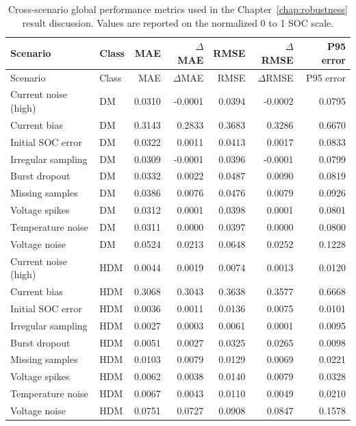 \documentclass[
    a4paper,
    12pt,
    titlepage,
    bibliography=totoc,
    twoside=on,
    parskip=false,
    numbers=noenddot,
    cleardoublepage=empty,
    DIV=12,
    BCOR=12.0mm,
    headheight=36pt,
    headings=openright
]{scrreprt}
\begin{document}
\begin{longtable}{p{2.4cm}p{1.3cm}rrrrr}
\caption[Cross-scenario global robustness metrics.]{Cross-scenario global performance metrics used in the Chapter~\ref{chap:robustness} result discussion. Values are reported on the normalized 0 to 1 SOC scale.}\label{tab:robustness_appendix_key_results}\\
\toprule
Scenario & Class & MAE & $\Delta$MAE & RMSE & $\Delta$RMSE & P95 error \\
\midrule
\endfirsthead
\toprule
Scenario & Class & MAE & $\Delta$MAE & RMSE & $\Delta$RMSE & P95 error \\
\midrule
\endhead
Current noise (high) & DM & 0.0310 & -0.0001 & 0.0394 & -0.0002 & 0.0795 \\
Current bias & DM & 0.3143 & 0.2833 & 0.3683 & 0.3286 & 0.6670 \\
Initial SOC error & DM & 0.0322 & 0.0011 & 0.0413 & 0.0017 & 0.0833 \\
Irregular sampling & DM & 0.0309 & -0.0001 & 0.0396 & -0.0001 & 0.0799 \\
Burst dropout & DM & 0.0332 & 0.0022 & 0.0487 & 0.0090 & 0.0819 \\
Missing samples & DM & 0.0386 & 0.0076 & 0.0476 & 0.0079 & 0.0926 \\
Voltage spikes & DM & 0.0312 & 0.0001 & 0.0398 & 0.0001 & 0.0801 \\
Temperature noise & DM & 0.0311 & 0.0000 & 0.0397 & 0.0000 & 0.0800 \\
Voltage noise & DM & 0.0524 & 0.0213 & 0.0648 & 0.0252 & 0.1228 \\
Current noise (high) & HDM & 0.0044 & 0.0019 & 0.0074 & 0.0013 & 0.0120 \\
Current bias & HDM & 0.3068 & 0.3043 & 0.3638 & 0.3577 & 0.6668 \\
Initial SOC error & HDM & 0.0036 & 0.0011 & 0.0136 & 0.0075 & 0.0101 \\
Irregular sampling & HDM & 0.0027 & 0.0003 & 0.0061 & 0.0001 & 0.0095 \\
Burst dropout & HDM & 0.0051 & 0.0027 & 0.0325 & 0.0265 & 0.0098 \\
Missing samples & HDM & 0.0103 & 0.0079 & 0.0129 & 0.0069 & 0.0221 \\
Voltage spikes & HDM & 0.0062 & 0.0038 & 0.0140 & 0.0079 & 0.0328 \\
Temperature noise & HDM & 0.0067 & 0.0043 & 0.0110 & 0.0049 & 0.0210 \\
Voltage noise & HDM & 0.0751 & 0.0727 & 0.0908 & 0.0847 & 0.1578 \\

\end{longtable}
\end{document}
